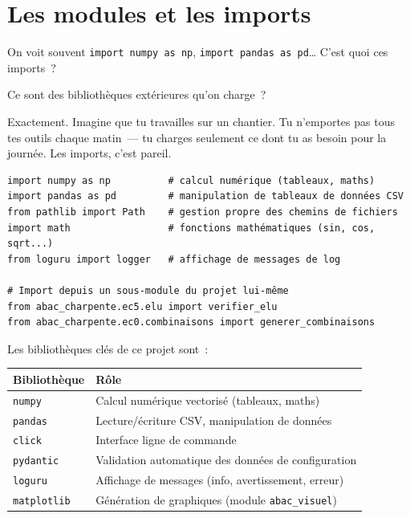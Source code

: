 \documentclass[12pt, a4paper, openany]{book}
\newcommand{\py}[1]{\texttt{#1}}
\begin{document}
\section{Les modules et les imports}

\begin{maitre}
On voit souvent \py{import numpy as np}, \py{import pandas as pd}\ldots{}
C'est quoi ces imports~?
\end{maitre}

\begin{apprenti}
Ce sont des biblioth\`eques ext\'erieures qu'on charge~?
\end{apprenti}

\begin{maitre}
Exactement. Imagine que tu travailles sur un chantier.
Tu n'emportes pas tous tes outils chaque matin~---
tu charges seulement ce dont tu as besoin pour la journ\'ee.
Les imports, c'est pareil.
\end{maitre}

\begin{lstlisting}[style=python, caption={Imports typiques dans ce projet}]
import numpy as np          # calcul numérique (tableaux, maths)
import pandas as pd         # manipulation de tableaux de données CSV
from pathlib import Path    # gestion propre des chemins de fichiers
import math                 # fonctions mathématiques (sin, cos, sqrt...)
from loguru import logger   # affichage de messages de log

# Import depuis un sous-module du projet lui-même
from abac_charpente.ec5.elu import verifier_elu
from abac_charpente.ec0.combinaisons import generer_combinaisons
\end{lstlisting}

Les biblioth\`eques cl\'es de ce projet sont~:

\begin{center}
\begin{tabular}{ll}
\toprule
\textbf{Biblioth\`eque} & \textbf{R\^ole}\\
\midrule
\py{numpy}    & Calcul num\'erique vectoris\'e (tableaux, maths)\\
\py{pandas}   & Lecture/\'ecriture CSV, manipulation de donn\'ees\\
\py{click}    & Interface ligne de commande\\
\py{pydantic} & Validation automatique des donn\'ees de configuration\\
\py{loguru}   & Affichage de messages (info, avertissement, erreur)\\
\py{matplotlib} & G\'en\'eration de graphiques (module \py{abac\_visuel})\\
\bottomrule
\end{tabular}
\end{center}
\end{document}
